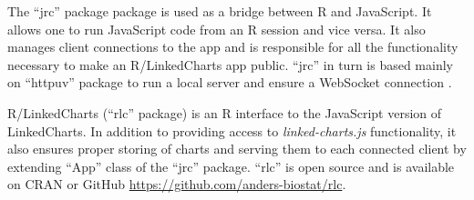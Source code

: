 \documentclass[twocolumn,10pt]{article}
\begin{document}
The ``jrc'' package \citep{jrc_2020} package is used as a bridge between R and JavaScript. It allows one to run JavaScript code from an R session and vice versa. It also manages client connections to the app and is responsible for all the functionality necessary to make an R/LinkedCharts app public. ``jrc'' in turn is based mainly on ``httpuv'' \citep{cheng_2020} package to run a local server and ensure a WebSocket connection \citep{fette_rfc_2011}. 

R/LinkedCharts (``rlc'' package) is an R \citep{R_2019} interface to the JavaScript version of LinkedCharts. In addition to providing access to \emph{linked-charts.js} functionality, it also ensures proper storing of charts and serving them to each connected client by extending ``App'' class of the ``jrc'' package. ``rlc'' is open source and is available on CRAN or GitHub \url{https://github.com/anders-biostat/rlc}.

\begin{small} 

\end{small}
\end{document}
